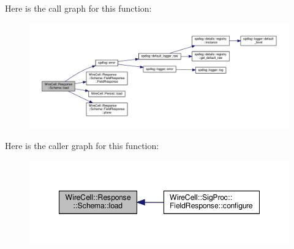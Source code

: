Here is the call graph for this function\+:
\nopagebreak
\begin{figure}[H]
\begin{center}
\leavevmode
\includegraphics[width=350pt]{namespace_wire_cell_1_1_response_1_1_schema_a4b86873ce3e615148bc29b75b74bab9c_cgraph}
\end{center}
\end{figure}
Here is the caller graph for this function\+:
\nopagebreak
\begin{figure}[H]
\begin{center}
\leavevmode
\includegraphics[width=348pt]{namespace_wire_cell_1_1_response_1_1_schema_a4b86873ce3e615148bc29b75b74bab9c_icgraph}
\end{center}
\end{figure}
